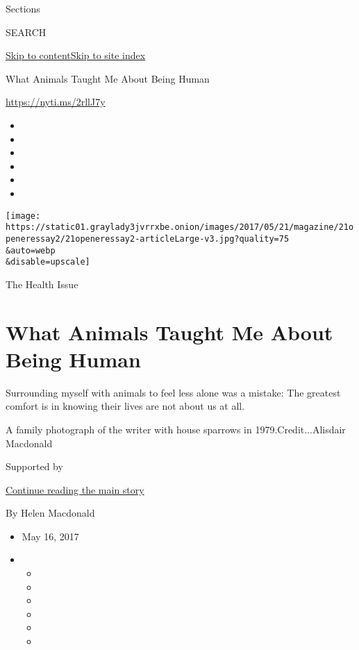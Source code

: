Sections

SEARCH

\protect\hyperlink{site-content}{Skip to
content}\protect\hyperlink{site-index}{Skip to site index}

What Animals Taught Me About Being Human

\url{https://nyti.ms/2rllJ7y}

\begin{itemize}
\item
\item
\item
\item
\item
\item
\end{itemize}

\texttt{[image: https://static01.graylady3jvrrxbe.onion/images/2017/05/21/magazine/21openeressay2/21openeressay2-articleLarge-v3.jpg?quality=75\\\&auto=webp\\\&disable=upscale]}

The Health Issue

\hypertarget{what-animals-taught-me-about-being-human}{%
\section{What Animals Taught Me About Being
Human}\label{what-animals-taught-me-about-being-human}}

Surrounding myself with animals to feel less alone was a mistake: The
greatest comfort is in knowing their lives are not about us at all.

A family photograph of the writer with house sparrows in
1979.Credit...Alisdair Macdonald

Supported by

\protect\hyperlink{after-sponsor}{Continue reading the main story}

By Helen Macdonald

\begin{itemize}
\item
  May 16, 2017
\item
  \begin{itemize}
  \item
  \item
  \item
  \item
  \item
  \item
  \end{itemize}
\end{itemize}

